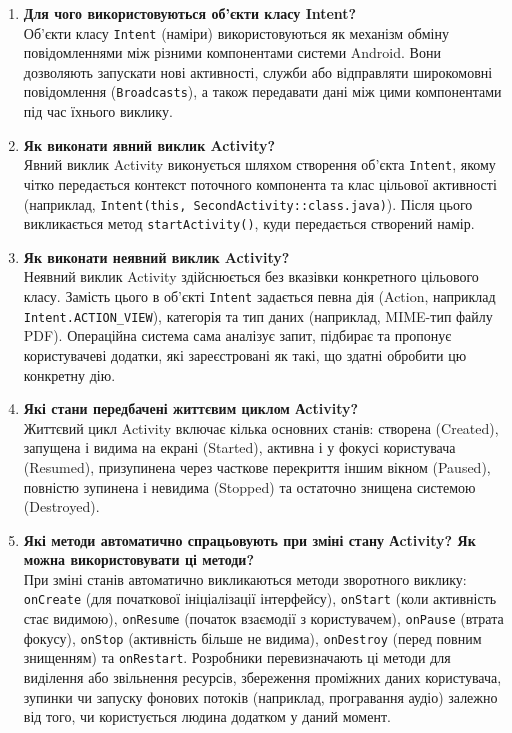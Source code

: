 \documentclass[14pt, a4paper]{extreport}
\begin{document}
	\begin{enumerate}
		\item \textbf{Для чого використовуються об'єкти класу Intent?} \\ Об'єкти класу \texttt{Intent} (наміри) використовуються як механізм обміну повідомленнями між різними компонентами системи Android. Вони дозволяють запускати нові активності, служби або відправляти широкомовні повідомлення (\texttt{Broadcasts}), а також передавати дані між цими компонентами під час їхнього виклику.
		
		\item \textbf{Як виконати явний виклик Activity?} \\ Явний виклик Activity виконується шляхом створення об'єкта \texttt{Intent}, якому чітко передається контекст поточного компонента та клас цільової активності (наприклад, \texttt{Intent(this, SecondActivity::class.java)}). Після цього викликається метод \texttt{startActivity()}, куди передається створений намір.
		
		\item \textbf{Як виконати неявний виклик Activity?} \\ Неявний виклик Activity здійснюється без вказівки конкретного цільового класу. Замість цього в об'єкті \texttt{Intent} задається певна дія (Action, наприклад \texttt{Intent.ACTION\_VIEW}), категорія та тип даних (наприклад, MIME-тип файлу PDF). Операційна система сама аналізує запит, підбирає та пропонує користувачеві додатки, які зареєстровані як такі, що здатні обробити цю конкретну дію.
		
		\item \textbf{Які стани передбачені життєвим циклом Аctivity?} \\ Життєвий цикл Activity включає кілька основних станів: створена (Created), запущена і видима на екрані (Started), активна і у фокусі користувача (Resumed), призупинена через часткове перекриття іншим вікном (Paused), повністю зупинена і невидима (Stopped) та остаточно знищена системою (Destroyed).
		
		\item \textbf{Які методи автоматично спрацьовують при зміні стану Аctivity? Як можна використовувати ці методи?} \\ При зміні станів автоматично викликаються методи зворотного виклику: \texttt{onCreate} (для початкової ініціалізації інтерфейсу), \texttt{onStart} (коли активність стає видимою), \texttt{onResume} (початок взаємодії з користувачем), \texttt{onPause} (втрата фокусу), \texttt{onStop} (активність більше не видима), \texttt{onDestroy} (перед повним знищенням) та \texttt{onRestart}. Розробники перевизначають ці методи для виділення або звільнення ресурсів, збереження проміжних даних користувача, зупинки чи запуску фонових потоків (наприклад, програвання аудіо) залежно від того, чи користується людина додатком у даний момент.
		

\end{enumerate}
\end{document}
